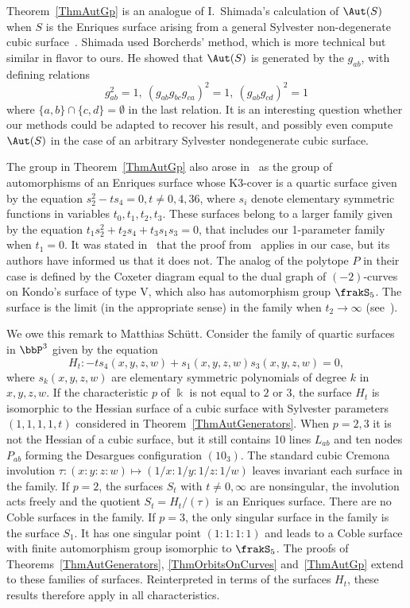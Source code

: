 \begin{rema}
Theorem~\ref{ThmAutGp} is an analogue of I.~Shimada's calculation of $\Aut(S)$ when $S$ is the Enriques surface arising from a general Sylvester non-degenerate cubic surface~\cite[Theorem~1.2]{Shimada}. Shimada used Borcherds' method, which is more technical but similar in flavor to ours. He showed that $\Aut(S)$ is generated by the $g_{ab}$, with defining relations
\[
g_{ab}^2 = 1, \ (g_{ab}g_{bc}g_{ca})^2 = 1,\ (g_{ab}g_{cd})^2 = 1
\]
where $\{a,b\}\cap \{c,d\} = \emptyset$ in the last relation. It is an interesting question whether our methods could be adapted to recover his result, and possibly even compute $\Aut(S)$ in the case of an arbitrary Sylvester nondegenerate cubic surface.

The group in Theorem~\ref{ThmAutGp} also arose in~\cite{Mukai} as the group of automorphisms of an Enriques surface whose K3-cover is a quartic surface given by the equation $s_2^2-ts_4 = 0, t\ne 0,4,36$, where $s_i$ denote elementary symmetric functions in variables $t_0,t_1,t_2,t_3$. These surfaces belong to a larger family given by the equation $t_1s_2^2+t_2s_4+t_3s_1s_3 = 0$, that includes our 1-parameter family when $t_1 = 0$. It was stated in~\cite{DolgachevSalem} that the proof from~\cite{Mukai} applies in our case, but its authors have informed us that it does not. The analog of the polytope $P$ in their case is defined by the Coxeter diagram equal to the dual graph of $(-2)$-curves on Kondo's surface of type V, which also has automorphism group $\frakS_5$. The surface is the limit (in the appropriate sense) in the family when $t_2\to \infty$ (see~\cite[Remark~2.3]{Mukai}).
\end{rema}

\begin{rema}
We owe this remark to Matthias Schütt. Consider the family of quartic surfaces in $\bbP^3$ given by the equation
\[
H_t:-ts_4(x,y,z,w)+s_1(x,y,z,w)s_3(x,y,z,w) = 0,
\]
where $s_k(x,y,z,w)$ are elementary symmetric polynomials of degree $k$ in $x,y,z,w$. If the characteristic $p$ of $\Bbbk$ is not equal to $2$ or $3$, the surface $H_t$ is isomorphic to the Hessian surface of a cubic surface with Sylvester parameters $(1,1,1,1,t)$ considered in Theorem~\ref{ThmAutGenerators}. When $p= 2,3$ it is not the Hessian of a cubic surface, but it still contains 10 lines $L_{ab}$ and ten nodes $P_{ab}$ forming the Desargues configuration $(10_3)$. The standard cubic Cremona involution $\tau:(x:y:z:w) \mapsto (1/x:1/y:1/z:1/w)$ leaves invariant each surface in the family. If $p = 2$, the surfaces $S_t$ with $t\ne 0,\infty$ are nonsingular, the involution acts freely and the quotient $S_t = H_t/(\tau)$ is an Enriques surface. There are no Coble surfaces in the family. If $p = 3$, the only singular surface in the family is the surface $S_1$. It has one singular point $(1{:}1{:}1{:}1)$ and leads to a Coble surface with finite automorphism group isomorphic to $\frakS_5$. The proofs of Theorems~\ref{ThmAutGenerators}, \ref{ThmOrbitsOnCurves} and~\ref{ThmAutGp} extend to these families of surfaces. Reinterpreted in terms of the surfaces $H_t$, these results therefore apply in all characteristics.
\end{rema}

